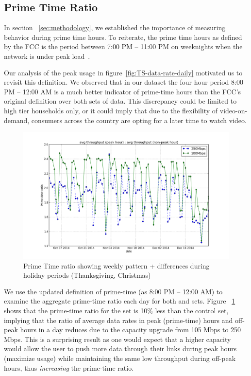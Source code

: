 \subsection{Prime Time Ratio}
\label{subsec:primetime}

In section ~\ref{sec:methodology}, we established the importance of measuring behavior during prime time hours. To reiterate, the prime time hours as defined by the FCC is the period between 7:00 PM -- 11:00 PM on weeknights when the network is under peak load~\cite{fcc2014measuring-broadband}. 

Our analysis of the peak usage in figure~\ref{fig:TS-data-rate-daily} motivated us to revisit this definition. We observed that in our dataset the four hour period 8:00 PM -- 12:00 AM is a much better indicator of prime-time hours than the FCC's original definition over both sets of data. This discrepancy could be limited to high tier households only, or it could imply that due to the flexibility of video-on-demand, consumers across the country are opting for a later time to watch video. 

\begin{figure}[ht!]
\begin{minipage}{\linewidth}
\centering
\includegraphics[width=\linewidth]{figures/prime-time-ratio-by-date[replace].png}
\caption{Prime Time ratio showing weekly pattern + differences during holiday periods (Thanksgiving, Christmas)}
\label{fig:TS-prime-time-ratio}
\end{minipage}
\end{figure}

We use the updated definition of prime-time (as 8:00 PM -- 12:00 AM) to examine the aggregate prime-time ratio each day for both \test and \control sets. Figure ~\ref{fig:TS-prime-time-ratio} shows that the prime-time ratio for the \test set is 10\% less than the control set, implying that the ratio of average data rates in peak (prime-time) hours and off-peak hours in a day reduces due to the capacity upgrade from 105 Mbps to 250 Mbps. This is a surprising result as one would expect that a higher capacity would allow the user to push more data through their links during peak hours (maximize usage) while maintaining the same low throughput during off-peak hours, thus \emph{increasing} the prime-time ratio.

